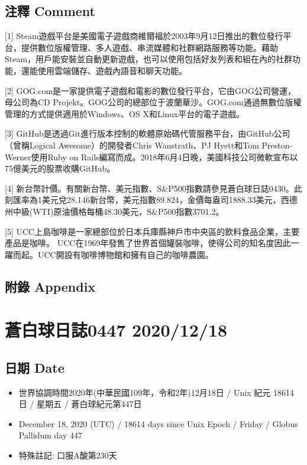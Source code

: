 \documentclass[a5paper, 10pt
]{book}
\providecommand{\tightlist}{%
  \setlength{\itemsep}{0pt}\setlength{\parskip}{0pt}}
\begin{document}
\hypertarget{ux6ce8ux91cb-comment-16}{%
\subsection{注釋 Comment}\label{ux6ce8ux91cb-comment-16}}

{[}1{]}
Steam遊戲平台是美國電子遊戲商維爾福於2003年9月12日推出的數位發行平台，提供數位版權管理、多人遊戲、串流媒體和社群網路服務等功能。藉助Steam，用戶能安裝並自動更新遊戲，也可以使用包括好友列表和組在內的社群功能，還能使用雲端儲存、遊戲內語音和聊天功能。

{[}2{]}
GOG.com是一家提供電子遊戲和電影的數位發行平台，它由GOG公司營運，母公司為CD
Projekt。GOG公司的總部位于波蘭華沙。GOG.com通過無數位版權管理的方式提供適用於Windows、OS
X和Linux平台的電子遊戲。

{[}3{]}
GitHub是透過Git進行版本控制的軟體原始碼代管服務平台，由GitHub公司（曾稱Logical
Awesome）的開發者Chris Wanstrath、PJ Hyett和Tom Preston-Werner使用Ruby
on
Rails編寫而成。2018年6月4日晚，美國科技公司微軟宣布以75億美元的股票收購GitHub。

{[}4{]}
新台幣計價。有關新台幣、美元指數、S\&P500指數請參見蒼白球日誌0430。此刻匯率為1美元兌28.146新台幣，美元指數89.824，金價每盎司1888.33美元，西德州中級(WTI)原油價格每桶48.30美元，S\&P500指數3701.2。

{[}5{]}
UCC上島咖啡是一家總部位於日本兵庫縣神戶市中央區的飲料食品企業，主要產品是咖啡。
UCC在1969年發售了世界首個罐裝咖啡，使得公司的知名度因此一躍而起。UCC開設有咖啡博物館和擁有自己的咖啡農園。

\hypertarget{ux9644ux9304-appendix-16}{%
\subsection{附錄 Appendix}\label{ux9644ux9304-appendix-16}}

\hypertarget{ux84bcux767dux7403ux65e5ux8a8c0447-20201218}{%
\section{蒼白球日誌0447
2020/12/18}\label{ux84bcux767dux7403ux65e5ux8a8c0447-20201218}}

\hypertarget{ux65e5ux671f-date-17}{%
\subsection{日期 Date}\label{ux65e5ux671f-date-17}}

\begin{itemize}
\tightlist
\item
  世界協調時間2020年(中華民國109年，令和2年)12月18日 / Unix 紀元 18614
  日 / 星期五 / 蒼白球紀元第447日
\item
  December 18, 2020 (UTC) / 18614 days since Unix Epoch / Friday /
  Globus Pallidum day 447
\item
  特殊註記: 口服A酸第230天
\end{itemize}
\end{document}
